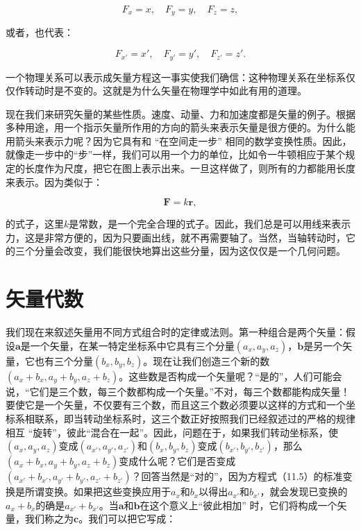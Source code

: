 \documentclass[12pt,oneside]{book}
\providecommand{\FLPvec}[1]{\boldsymbol{#1}}
\providecommand{\FLPF}[0]{\FLPvec{F}}
\providecommand{\FLPr}[0]{\FLPvec{r}}
\begin{document}
\begin{equation*}
F_x=x,\quad
F_y=y,\quad
F_z=z,
\end{equation*}

或者，也代表：


\begin{equation*}
F_{x'}=x',\quad
F_{y'}=y',\quad
F_{z'}=z'.
\end{equation*}


一个物理关系可以表示成矢量方程这一事实使我们确信：这种物理关系在坐标系仅仅作转动时是不变的。这就是为什么矢量在物理学中如此有用的道理。


现在我们来研究矢量的某些性质。速度、动量、力和加速度都是矢量的例子。根据多种用途，用一个指示矢量所作用的方向的箭头来表示矢量是很方便的。为什么能用箭头来表示力呢？因为它具有和 “在空间走一步” 相同的数学变换性质。因此，就像走一步中的“步”一样，我们可以用一个力的单位，比如令一牛顿相应于某个规定的长度作为尺度，把它在图上表示出来。一旦这样做了，则所有的力都能用长度来表示。因为类似于：


\begin{equation*}
\FLPF=k\FLPr,
\end{equation*}

的式子，这里$k$是常数，是一个完全合理的式子。因此，我们总是可以用线来表示力，这是非常方便的，因为只要画出线，就不再需要轴了。当然，当轴转动时，它的三个分量会改变，我们能很快地算出这些分量，因为这仅仅是一个几何问题。


\section{矢量代数}
我们现在来叙述矢量用不同方式组合时的定律或法则。第一种组合是两个矢量：假设$\boldsymbol{a}$是一个矢量，在某一特定坐标系中它具有三个分量$(a_x, a_y, a_z)$，$\boldsymbol{b}$是另一个矢量，它也有三个分量$(b_x, b_y, b_z)$。现在让我们创造三个新的数$(a_x + b_x, a_y + b_y, a_z + b_z)$。这些数是否构成一个矢量呢？“是的”，人们可能会说，“它们是三个数，每三个数都构成一个矢量。”不对，每三个数都能构成矢量！要使它是一个矢量，不仅要有三个数，而且这三个数必须要以这样的方式和一个坐标系相联系，即当转动坐标系时，这三个数正好按照我们已经叙述过的严格的规律相互 “旋转”，彼此“混合在一起”。因此，问题在于，如果我们转动坐标系，使$(a_x, a_y, a_z)$变成$(a_{x'},a_{y'},a_{z'})$和$(b_x, b_y, b_z)$变成$(b_{x'},b_{y'},b_{z'})$，那么$(a_x + b_x, a_y + b_y, a_z + b_z)$变成什么呢？它们是否变成$(a_{x'}+b_{x'}, a_{y'}+b_{y'}, a_{z'}+b_{z'})$？回答当然是“对的”，因为方程式（11.5）的标准变换是所谓变换。如果把这些变换应用于$a_x$和$b_x$以得出$a_{x'}$和$b_{x'}$，就会发现已变换的$a_x + b_x$的确是$a_{x'} + b_{x'}$。当$\boldsymbol{a}$和$\boldsymbol{b}$在这个意义上“彼此相加” 时，它们将构成一个矢量，我们称之为$\boldsymbol{c}$。我们可以把它写成：
\end{document}
